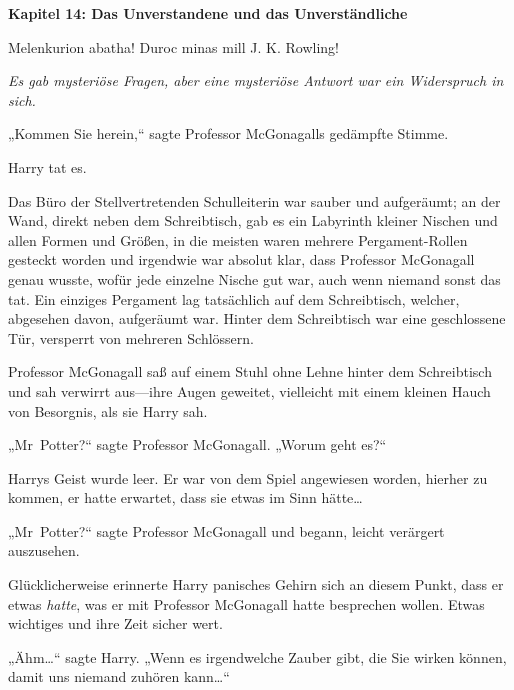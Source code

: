 

\hypertarget{das-unverstandene-und-das-unverstuxe4ndliche}{%

\textbf{Kapitel 14: Das Unverstandene und das Unverständliche}

Melenkurion abatha! Duroc minas mill J. K. Rowling!

\later

\emph{Es gab mysteriöse Fragen, aber eine mysteriöse Antwort war ein Widerspruch in sich.}

\later

„Kommen Sie herein,“ sagte Professor McGonagalls gedämpfte Stimme.

Harry tat es.

Das Büro der Stellvertretenden Schulleiterin war sauber und aufgeräumt; an der Wand, direkt neben dem Schreibtisch, gab es ein Labyrinth kleiner Nischen und allen Formen und Größen, in die meisten waren mehrere Pergament-Rollen gesteckt worden und irgendwie war absolut klar, dass Professor McGonagall genau wusste, wofür jede einzelne Nische gut war, auch wenn niemand sonst das tat. Ein einziges Pergament lag tatsächlich auf dem Schreibtisch, welcher, abgesehen davon, aufgeräumt war. Hinter dem Schreibtisch war eine geschlossene Tür, versperrt von mehreren Schlössern.

Professor McGonagall saß auf einem Stuhl ohne Lehne hinter dem Schreibtisch und sah verwirrt aus—ihre Augen geweitet, vielleicht mit einem kleinen Hauch von Besorgnis, als sie Harry sah.

„Mr~Potter?“ sagte Professor McGonagall. „Worum geht es?“

Harrys Geist wurde leer. Er war von dem Spiel angewiesen worden, hierher zu kommen, er hatte erwartet, dass sie etwas im Sinn hätte…

„Mr~Potter?“ sagte Professor McGonagall und begann, leicht verärgert auszusehen.

Glücklicherweise erinnerte Harry panisches Gehirn sich an diesem Punkt, dass er etwas \emph{hatte}, was er mit Professor McGonagall hatte besprechen wollen. Etwas wichtiges und ihre Zeit sicher wert.

„Ähm…“ sagte Harry. „Wenn es irgendwelche Zauber gibt, die Sie wirken können, damit uns niemand zuhören kann…“

}
